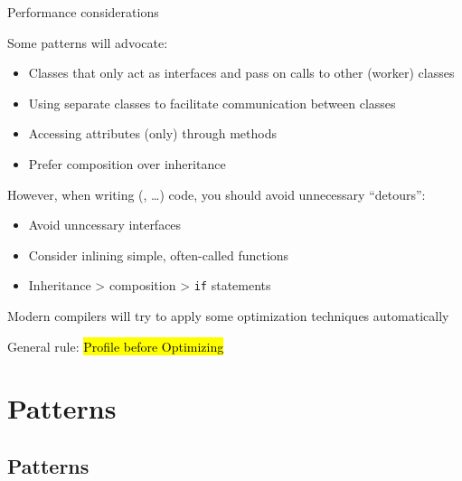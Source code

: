 \begin{frame}{Performance considerations}
	
	Some patterns will advocate:
	\begin{itemize}
		\item Classes that only act as interfaces and pass on calls to other (worker) classes
		\item Using separate classes to facilitate communication between classes
		\item Accessing attributes (only) through methods
		\item Prefer composition over inheritance
	\end{itemize}
	
	\bigskip
	However, when writing  (, \dots) code, you should avoid unnecessary \enquote{detours}:
	
	\begin{itemize}
		\item Avoid unncessary interfaces
		\item Consider inlining simple, often-called functions 
		\item Inheritance > composition > \texttt{if} statements
	\end{itemize}
	Modern compilers will try to apply some optimization techniques automatically 
	
	\bigskip
	General rule: \hl{Profile before Optimizing} 
\end{frame}

\section{Patterns}


\subsection{Patterns}

